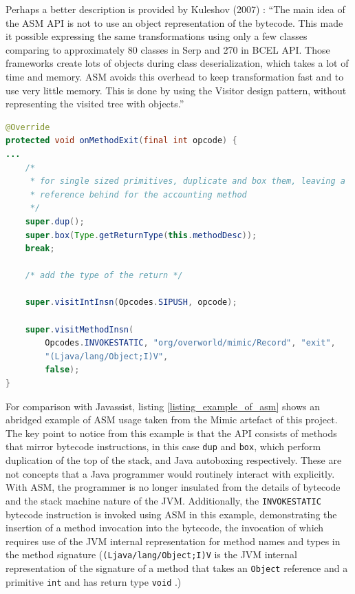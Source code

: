 \documentclass[]{final_report}
\begin{document}
Perhaps a better description is provided by Kuleshov (2007) \cite{kuleshov:2007}: ``The main idea of the ASM API is not to use an object representation of the bytecode. This made it possible expressing the same transformations using only a few classes comparing to approximately 80 classes in Serp and 270 in BCEL API. Those frameworks create lots of objects during class deserialization, which takes a lot of time and memory. ASM avoids this overhead to keep transformation fast and to use very little memory. This is done by using the Visitor design pattern, without representing the visited tree with objects.''

\begin{lstlisting}[language=java, caption=Example of ASM Usage, label={listing_example_of_asm}]
@Override
protected void onMethodExit(final int opcode) {
...
    /*
     * for single sized primitives, duplicate and box them, leaving a
     * reference behind for the accounting method
     */
    super.dup();
    super.box(Type.getReturnType(this.methodDesc));
    break;

    /* add the type of the return */

    super.visitIntInsn(Opcodes.SIPUSH, opcode);

    super.visitMethodInsn(
        Opcodes.INVOKESTATIC, "org/overworld/mimic/Record", "exit",
        "(Ljava/lang/Object;I)V",
        false);
}
\end{lstlisting}

For comparison with Javassist, listing \ref{listing_example_of_asm} shows an abridged example of ASM usage taken from the Mimic artefact of this project. The key point to notice from this example is that the API consists of methods that mirror bytecode instructions, in this case \lstinline{dup} and \lstinline{box}, which perform duplication of the top of the stack, and Java autoboxing respectively. These are not concepts that a Java programmer would routinely interact with explicitly. With ASM, the programmer is no longer insulated from the details of bytecode and the stack machine nature of the JVM. Additionally, the \lstinline{INVOKESTATIC}\noop{} bytecode instruction is invoked using ASM in this example, demonstrating the insertion of a method invocation into the bytecode, the invocation of which requires use of the JVM internal representation for method names and types in the method signature (\lstinline{(Ljava/lang/Object;I)V}\noop{} is the JVM internal representation of the signature of a method that takes an \lstinline{Object}\noop{}  reference and a primitive \lstinline{int}\noop{}  and has return type \lstinline{void}\noop{} .)
\end{document}
